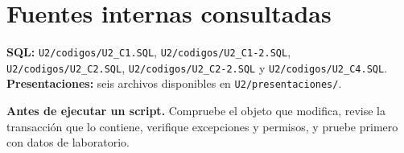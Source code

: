 \documentclass[10pt,letterpaper]{article}
\newenvironment{ideaclave}[1][Idea clave]
  {\par\smallskip\begingroup\raggedright
   \noindent\textcolor{turquesa}{\textbf{#1.}}\enspace}
  {\par\endgroup\smallskip}
\begin{document}
\section*{Fuentes internas consultadas}
{\small
\textbf{SQL:} \nolinkurl{U2/codigos/U2_C1.SQL},
\nolinkurl{U2/codigos/U2_C1-2.SQL}, \nolinkurl{U2/codigos/U2_C2.SQL},
\nolinkurl{U2/codigos/U2_C2-2.SQL} y \nolinkurl{U2/codigos/U2_C4.SQL}.
\textbf{Presentaciones:} seis archivos disponibles en
\nolinkurl{U2/presentaciones/}.\par}

\begin{ideaclave}[Antes de ejecutar un script]
Compruebe el objeto que modifica, revise la transacción que lo contiene,
verifique excepciones y permisos, y pruebe primero con datos de laboratorio.
\end{ideaclave}
\end{document}
